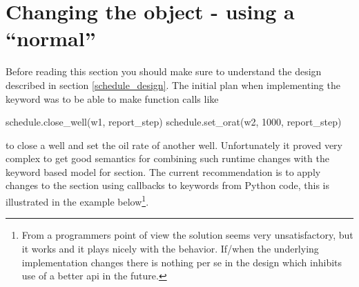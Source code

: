 \section{Changing the  object - using a ``normal'' \actionx{}}
\label{pyaction_actionx}
Before reading this section you should make sure to understand the
 design described in section \ref{schedule_design}. The
initial plan when implementing the \pyaction{} keyword was to be able to make
function calls like
\begin{code}
  schedule.close_well(w1, report_step)
  schedule.set_orat(w2, 1000, report_step)
\end{code}
to close a well and set the oil rate of another well. Unfortunately it proved
very complex to get good semantics for combining such runtime changes with the
keyword based model for  section. The current recommendation is to
apply changes to the  section using callbacks to 
keywords from Python code, this is illustrated in the example
below\footnote{From a programmers point of view the solution seems very
unsatisfactory, but it works and it plays nicely with the  behavior.
If/when the underlying  implementation changes there is
nothing per se in the \pyaction{} design which inhibits use of a better
 api in the future.}.

